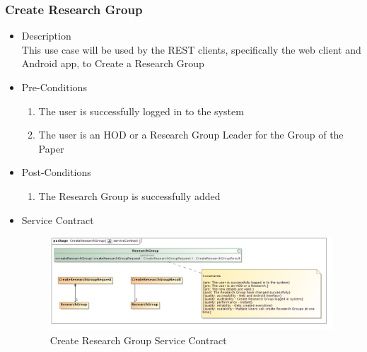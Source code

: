 \documentclass[a4paper,10pt]{article}
\begin{document}
\subsubsection{Create Research Group}
	\begin{itemize}
		\item Description\\
			This use case will be used by the REST clients, specifically the web client and Android app, to Create a Research Group
		\item Pre-Conditions
			\begin{enumerate}
				\item The user is successfully logged in to the system
				\item The user is an HOD or a Research Group Leader for the Group of the Paper
			\end{enumerate}
		\item Post-Conditions
			\begin{enumerate}
				\item The Research Group is successfully added
						
			\end{enumerate}
		\item Service Contract
			\begin{figure}[H]
				\includegraphics[scale=0.5]{createResearchGroup}
				\caption{Create Research Group Service Contract}
			\end{figure}
	\end{itemize}
	
\end{document}
